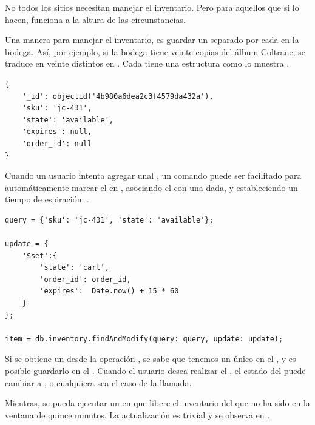 No todos los sitios \ecommerce necesitan manejar el inventario. Pero para aquellos que si lo hacen, \mongodbNAME funciona a la altura de las circunstancias.

Una manera para manejar el inventario, es guardar un \documentDB separado por cada \physItem en la bodega. Así, por ejemplo, si la bodega tiene veinte copias del álbum Coltrane, se traduce en veinte \documentsDB distintos en \inventoryCommerce \collectionDB. Cada \documentDB tiene una estructura como lo muestra .

\begin{lstlisting}[caption= Ejemplo de \documentDB para un \itemCOM., label=source:javascript:example_document_inventory_mongodb]
{
	'_id': objectid('4b980a6dea2c3f4579da432a'),
	'sku': 'jc-431',
	'state': 'available',
	'expires': null,
	'order_id': null
}
\end{lstlisting}


Cuando un usuario intenta agregar un\itemCOM al \cartCOM, un comando \findAndModifyOperatorDB puede ser facilitado para automáticamente marcar el \itemCOM en \inCart, asociando el \itemCOM con una \orderCommerce dada, y estableciendo un tiempo de espiración. .

\begin{lstlisting}[caption= Marcando un \itemCOM con tiempo de espiración., label=source:javascript:example_add_inventory_expiartion_mongodb]
query = {'sku': 'jc-431', 'state': 'available'};

update = {
	'$set':{
		'state': 'cart',
		'order_id': order_id,
		'expires':  Date.now() + 15 * 60
	}
};

item = db.inventory.findAndModify(query: query, update: update);
\end{lstlisting}

Si se obtiene un \itemBackDB desde la operación \findAndModifyOperatorDB, se sabe que tenemos un único \lockDB en el \itemCOM, y es posible guardarlo en el \cartCOM. Cuando el usuario desea realizar el \checkoutCOM, el estado del \itemCOM puede cambiar a \purchasedCOM, o cualquiera sea el caso de la llamada.

Mientras, se pueda ejecutar un \scriptPL en \backgroundPL que libere el inventario del \cartCOM que no ha sido \purchasedCOM en la ventana de quince minutos. La actualización es trivial y se observa en .


